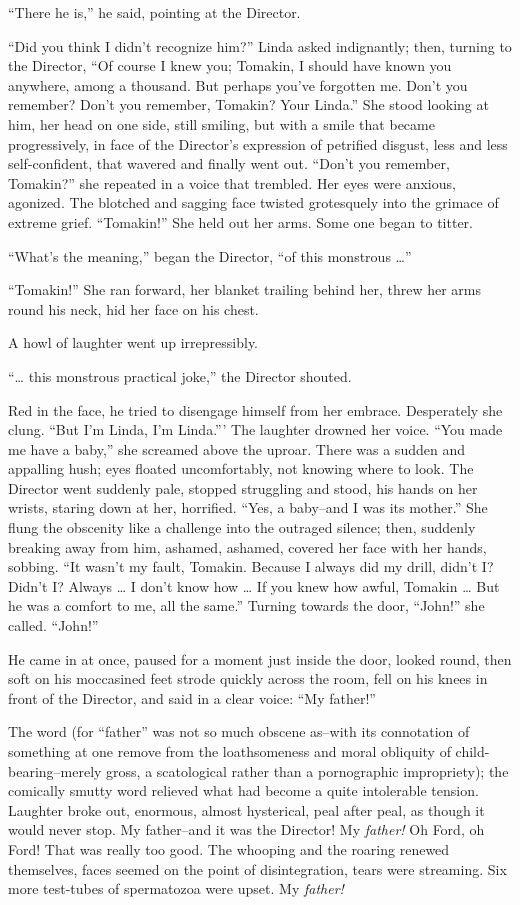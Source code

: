 \documentclass[12pt]{report}
\begin{document}
``There he is,'' he said, pointing at the Director.

``Did you think I didn't recognize him?'' Linda asked indignantly; then,
turning to the Director, ``Of course I knew you; Tomakin, I should have
known you anywhere, among a thousand. But perhaps you've forgotten me.
Don't you remember? Don't you remember, Tomakin? Your Linda.'' She stood
looking at him, her head on one side, still smiling, but with a smile
that became progressively, in face of the Director's expression of
petrified disgust, less and less self-confident, that wavered and
finally went out. ``Don't you remember, Tomakin?'' she repeated in a
voice that trembled. Her eyes were anxious, agonized. The blotched and
sagging face twisted grotesquely into the grimace of extreme grief.
``Tomakin!'' She held out her arms. Some one began to titter.

``What's the meaning,'' began the Director, ``of this monstrous
\ldots{}''

``Tomakin!'' She ran forward, her blanket trailing behind her, threw her
arms round his neck, hid her face on his chest.

A howl of laughter went up irrepressibly.

``\ldots{} this monstrous practical joke,'' the Director shouted.

Red in the face, he tried to disengage himself from her embrace.
Desperately she clung. ``But I'm Linda, I'm Linda.''' The laughter
drowned her voice. ``You made me have a baby,'' she screamed above the
uproar. There was a sudden and appalling hush; eyes floated
uncomfortably, not knowing where to look. The Director went suddenly
pale, stopped struggling and stood, his hands on her wrists, staring
down at her, horrified. ``Yes, a baby--and I was its mother.'' She flung
the obscenity like a challenge into the outraged silence; then, suddenly
breaking away from him, ashamed, ashamed, covered her face with her
hands, sobbing. ``It wasn't my fault, Tomakin. Because I always did my
drill, didn't I? Didn't I? Always \ldots{} I don't know how \ldots{} If
you knew how awful, Tomakin \ldots{} But he was a comfort to me, all the
same.'' Turning towards the door, ``John!'' she called. ``John!''

He came in at once, paused for a moment just inside the door, looked
round, then soft on his moccasined feet strode quickly across the room,
fell on his knees in front of the Director, and said in a clear voice:
``My father!''

The word (for ``father'' was not so much obscene as--with its
connotation of something at one remove from the loathsomeness and moral
obliquity of child-bearing--merely gross, a scatological rather than a
pornographic impropriety); the comically smutty word relieved what had
become a quite intolerable tension. Laughter broke out, enormous, almost
hysterical, peal after peal, as though it would never stop. My
father--and it was the Director! My \emph{father!} Oh Ford, oh Ford!
That was really too good. The whooping and the roaring renewed
themselves, faces seemed on the point of disintegration, tears were
streaming. Six more test-tubes of spermatozoa were upset. My
\emph{father!}
\end{document}
